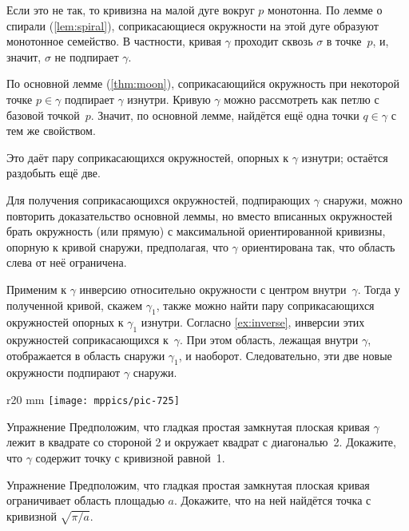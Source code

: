 Если это не так, то кривизна на малой дуге вокруг $p$ монотонна.
По лемме о спирали (\ref{lem:spiral}), соприкасающиеся окружности на этой дуге образуют монотонное семейство.
В частности, кривая $\gamma$ проходит сквозь $\sigma$ в точке~$p$, и, значит, $\sigma$ не подпирает $\gamma$.
\qeds

По основной лемме (\ref{thm:moon}), соприкасающийся окружность при некоторой точке $p\in\gamma$ подпирает $\gamma$ изнутри.
Кривую $\gamma$ можно рассмотреть как петлю с базовой точкой~$p$.
Значит, по основной лемме, найдётся ещё одна точки $q\in\gamma$ с тем же свойством.

Это даёт пару соприкасающихся окружностей, опорных к $\gamma$ изнутри;
остаётся раздобыть ещё две.

Для получения соприкасающихся окружностей, подпирающих $\gamma$ снаружи, можно повторить доказательство основной леммы, но вместо вписанных окружностей брать окружность (или прямую) с максимальной ориентированной кривизны, опорную к кривой снаружи, предполагая, что $\gamma$ ориентирована так, что область слева от неё ограничена.
\qeds

Применим к $\gamma$ инверсию относительно окружности с центром внутри~$\gamma$. Тогда у полученной кривой, скажем $\gamma_1$, также можно найти пару соприкасающихся окружностей опорных к $\gamma_1$ изнутри.
Согласно \ref{ex:inverse}, инверсии этих окружностей соприкасающихся к~$\gamma$.
При этом область, лежащая внутри $\gamma$, отображается в область снаружи $\gamma_1$, и наоборот.
Следовательно, эти две новые окружности подпирают $\gamma$ снаружи.\qeds


{

\begin{wrapfigure}{r}{20 mm}
\vskip-0mm
\centering
\texttt{[image: mppics/pic-725]}
\vskip0mm
\end{wrapfigure}

\begin{thm}{Упражнение}\label{ex:2-squares}
Предположим, что гладкая простая замкнутая плоская кривая \(\gamma\) лежит в квадрате со стороной 2 и окружает квадрат с диагональю~2.
Докажите, что \(\gamma\) содержит точку с кривизной равной~1.
\end{thm}

}

\begin{thm}{Упражнение}\label{ex:moon-area}
Предположим, что гладкая простая замкнутая плоская кривая ограничивает область площадью $a$.
Докажите, что на ней найдётся точка с кривизной $\sqrt{\pi/a}$.
\end{thm}


